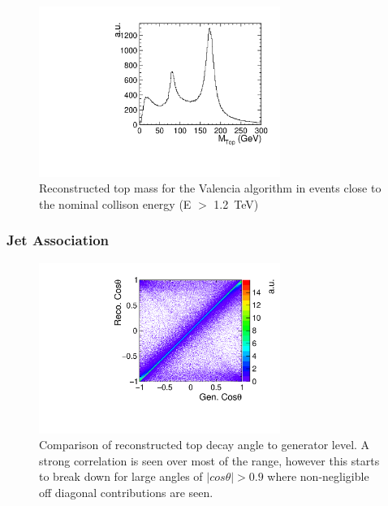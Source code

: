 \begin{figure}
  \centering
  \includegraphics[width=0.7\textwidth]{TopAnalysis/figures/TopMass_EOver1200.pdf}
  \caption[Performance of Valencia algorithm for high energy events]{Reconstructed top mass for the Valencia algorithm in events close to the nominal collison energy (E $>$ 1.2~TeV)}
  \label{fig:highEValencia}
\end{figure}


\subsubsection{Jet Association}

\begin{figure}
  \centering
  \includegraphics[width=0.7\textwidth]{TopAnalysis/figures/CosThetaRecoVsMC.pdf}
  \caption[Comparison of reconstructed top decay angle to generator level]{Comparison of reconstructed top decay angle to generator level. A strong correlation is seen over most of the range, however this starts to break down for large angles of $\mid cos\theta \mid>0.9$ where non-negligible off diagonal contributions are seen.}
  \label{fig:2djetangle}
\end{figure}

